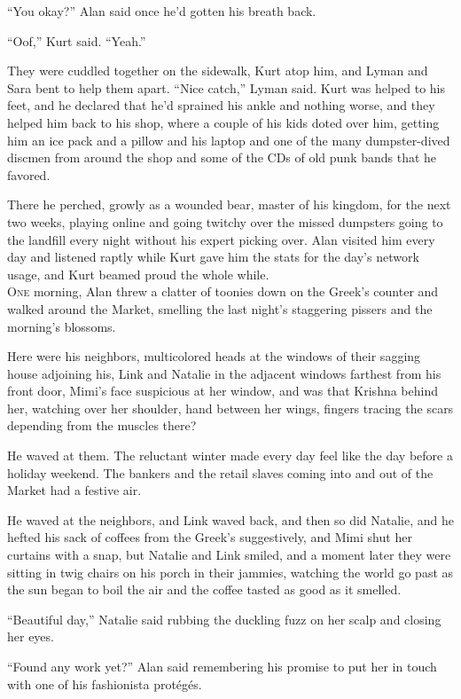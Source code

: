 \documentclass{article}
\begin{document}
``You okay?'' Alan said once he'd gotten his breath back.

``Oof,'' Kurt said.  ``Yeah.''

They were cuddled together on the sidewalk, Kurt atop him, and Lyman
and Sara bent to help them apart.  ``Nice catch,'' Lyman said.  Kurt
was helped to his feet, and he declared that he'd sprained his ankle
and nothing worse, and they helped him back to his shop, where a
couple of his kids doted over him, getting him an ice pack and a
pillow and his laptop and one of the many dumpster-dived discmen from
around the shop and some of the CDs of old punk bands that he favored.

There he perched, growly as a wounded bear, master of his kingdom, for
the next two weeks, playing online and going twitchy over the missed
dumpsters going to the landfill every night without his expert picking
over.  Alan visited him every day and listened raptly while Kurt gave
him the stats for the day's network usage, and Kurt beamed proud the
whole while.
\\
\lettrine[lines=3, lhang=.5, nindent=0pt, findent=2pt]{O}{ne} morning, Alan threw a clatter of toonies down on the Greek's
counter and walked around the Market, smelling the last night's
staggering pissers and the morning's blossoms.

Here were his neighbors, multicolored heads at the windows of their
sagging house adjoining his, Link and Natalie in the adjacent windows
farthest from his front door, Mimi's face suspicious at her window,
and was that Krishna behind her, watching over her shoulder, hand
between her wings, fingers tracing the scars depending from the
muscles there?

He waved at them.  The reluctant winter made every day feel like the
day before a holiday weekend.  The bankers and the retail slaves
coming into and out of the Market had a festive air.

He waved at the neighbors, and Link waved back, and then so did
Natalie, and he hefted his sack of coffees from the Greek's
suggestively, and Mimi shut her curtains with a snap, but Natalie and
Link smiled, and a moment later they were sitting in twig chairs on
his porch in their jammies, watching the world go past as the sun
began to boil the air and the coffee tasted as good as it smelled.

``Beautiful day,'' Natalie said rubbing the duckling fuzz on her scalp
and closing her eyes.

``Found any work yet?'' Alan said remembering his promise to put her
in touch with one of his fashionista prot\'{e}g\'{e}s.
\end{document}
